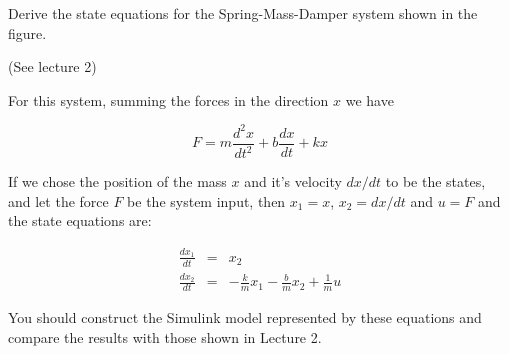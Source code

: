 \begin{slide}
	Derive the state equations for the Spring-Mass-Damper system shown in the figure.
	\begin{center}
	\end{center}
	(See lecture 2)
\end{slide}

For this system, summing the forces in the direction $x$ we have

$$F = m\frac{d^2x}{dt^2} + b\frac{dx}{dt} + kx$$

If we chose the position of the mass $x$ and it's velocity $dx/dt$ to be the states, and let the force $F$ be the system input, then $x_1 = x$, $x_2 = dx/dt$ and $u=F$ and the state equations are:

\begin{eqnarray*}
	\frac{dx_1}{dt} & = & x_2 \\
	\frac{dx_2}{dt} & = & -\frac{k}{m} x_1 -\frac{b}{m} x_2 + \frac{1}{m} u
\end{eqnarray*}

You should construct the Simulink model represented by these equations and compare the results with those shown in Lecture 2.

